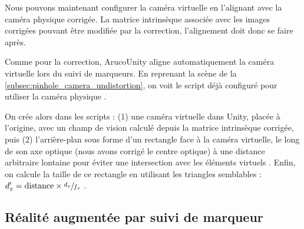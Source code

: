 Nous pouvons maintenant configurer la caméra virtuelle en l'alignant avec la caméra physique corrigée. La matrice intrinsèque associée avec les images corrigées pouvant être modifiée par la correction, l'alignement doit donc se faire après.

Comme pour la correction, ArucoUnity aligne automatiquement la caméra virtuelle lors du suivi de marqueurs. En reprenant la scène de la \autoref{subsec:pinhole_camera_undistortion}, on voit le script déjà configuré pour utiliser la caméra physique .

On crée alors dans les scripts : (1) une caméra virtuelle dans Unity, placée à l'origine, avec un champ de vision calculé  depuis la matrice intrinsèque corrigée, puis (2) l'arrière-plan sous forme d'un rectangle face à la caméra virtuelle, le long de son axe optique (nous avons corrigé le centre optique) à une distance arbitraire lontaine pour éviter une intersection avec les éléments virtuels . Enfin, on calcule la taille de ce rectangle en utilisant les triangles semblables : $d_x' = \text{distance} \times \sfrac{d_x}{f_x}$ .

\subsection{Réalité augmentée par suivi de marqueur}
\label{subsec:pinhole_camera_tracker}




